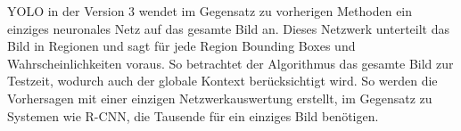 \ac{YOLO} in der Version 3 wendet im Gegensatz zu vorherigen Methoden ein einziges neuronales Netz auf das gesamte Bild an. Dieses Netzwerk unterteilt das Bild in Regionen und sagt für jede Region Bounding Boxes und Wahrscheinlichkeiten voraus.
So betrachtet der Algorithmus das gesamte Bild zur Testzeit, wodurch auch der globale Kontext berücksichtigt wird. So werden die Vorhersagen mit einer einzigen Netzwerkauswertung erstellt, im Gegensatz zu Systemen wie \ac{R-CNN}, die Tausende für ein einziges Bild benötigen.






